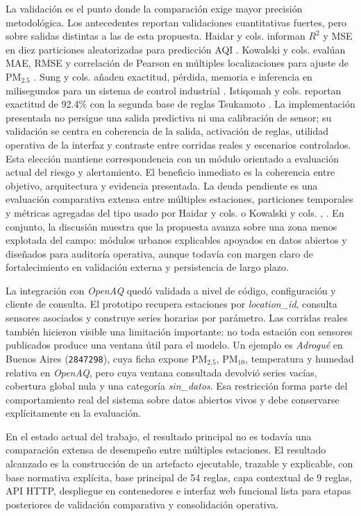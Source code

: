 La validación es el punto donde la comparación exige mayor precisión metodológica. Los antecedentes reportan validaciones cuantitativas fuertes, pero sobre salidas distintas a las de esta propuesta. Haidar y cols. informan \(R^2\) y MSE en diez particiones aleatorizadas para predicción AQI \cite[pp.~4--5]{A028}. Kowalski y cols. evalúan MAE, RMSE y correlación de Pearson en múltiples localizaciones para ajuste de PM$_{2.5}$ \cite[pp.~6,~9--12]{A084}. Sung y cols. añaden exactitud, pérdida, memoria e inferencia en milisegundos para un sistema de control industrial \cite[pp.~16--25]{A114}. Istiqomah y cols. reportan exactitud de 92.4\% con la segunda base de reglas Tsukamoto \cite[pp.~4--6]{A165}. La implementación presentada no persigue una salida predictiva ni una calibración de sensor; su validación se centra en coherencia de la salida, activación de reglas, utilidad operativa de la interfaz y contraste entre corridas reales y escenarios controlados. Esta elección mantiene correspondencia con un módulo orientado a evaluación actual del riesgo y alertamiento. El beneficio inmediato es la coherencia entre objetivo, arquitectura y evidencia presentada. La deuda pendiente es una evaluación comparativa extensa entre múltiples estaciones, particiones temporales y métricas agregadas del tipo usado por Haidar y cols. o Kowalski y cols. \cite[pp.~4--5]{A028}, \cite[pp.~9--12]{A084}. En conjunto, la discusión muestra que la propuesta avanza sobre una zona menos explotada del campo: módulos urbanos explicables apoyados en datos abiertos y diseñados para auditoría operativa, aunque todavía con margen claro de fortalecimiento en validación externa y persistencia de largo plazo.

La integración con \textit{OpenAQ} quedó validada a nivel de código, configuración y cliente de consulta. El prototipo recupera estaciones por \textit{location\_id}, consulta sensores asociados y construye series horarias por parámetro. Las corridas reales también hicieron visible una limitación importante: no toda estación con sensores publicados produce una ventana útil para el modelo. Un ejemplo es \textit{Adrogué} en Buenos Aires (\texttt{2847298}), cuya ficha expone PM$_{2.5}$, PM$_{10}$, temperatura y humedad relativa en \textit{OpenAQ}, pero cuya ventana consultada devolvió series vacías, cobertura global nula y una categoría \textit{sin\_datos}. Esa restricción forma parte del comportamiento real del sistema sobre datos abiertos vivos y debe conservarse explícitamente en la evaluación.

En el estado actual del trabajo, el resultado principal no es todavía una comparación extensa de desempeño entre múltiples estaciones. El resultado alcanzado es la construcción de un artefacto ejecutable, trazable y explicable, con base normativa explícita, base principal de 54 reglas, capa contextual de 9 reglas, API HTTP, despliegue en contenedores e interfaz web funcional lista para etapas posteriores de validación comparativa y consolidación operativa.
